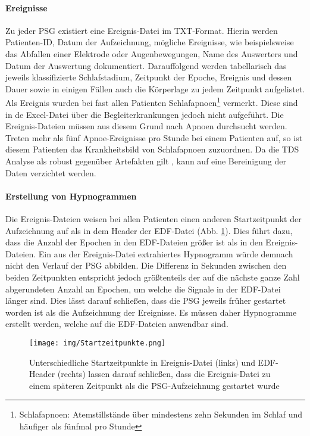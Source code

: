\paragraph{Ereignisse} Zu jeder \acs{PSG} existiert eine Ereignis-Datei im TXT-Format. Hierin werden Patienten-ID, Datum der Aufzeichnung, mögliche Ereignisse, wie beispielsweise das Abfallen einer Elektrode oder Augenbewegungen, Name des Auswerters und Datum der Auswertung dokumentiert. Darauffolgend werden tabellarisch das jeweils klassifizierte Schlafstadium, Zeitpunkt der Epoche, Ereignis und dessen Dauer sowie in einigen Fällen auch die Körperlage zu jedem Zeitpunkt aufgelistet. Als Ereignis wurden bei fast allen Patienten Schlafapnoen\footnote{Schlafapnoen: Atemstillstände über mindestens zehn Sekunden im Schlaf und häufiger als fünfmal pro Stunde} vermerkt. Diese sind in de Excel-Datei über die Begleiterkrankungen jedoch nicht aufgeführt. Die Ereignis-Dateien müssen aus diesem Grund nach Apnoen durchsucht werden. Treten mehr als fünf Apnoe-Ereignisse pro Stunde bei einem Patienten auf, so ist diesem Patienten das Krankheitsbild von Schlafapnoen zuzuordnen. 
Da die \acs{TDS} Analyse als robust gegenüber Artefakten gilt \parencite{breuer_netzwerktopologie_2016}, kann auf eine Bereinigung der Daten verzichtet werden.

\paragraph{Erstellung von Hypnogrammen} Die Ereignis-Dateien weisen bei allen Patienten einen anderen Startzeitpunkt der Aufzeichnung auf als in dem Header der \acs{EDF}-Datei (Abb. \ref{fig:zeitpunkte}). Dies führt dazu, dass die Anzahl der Epochen in den \acs{EDF}-Dateien größer ist als in den Ereignis-Dateien. Ein aus der Ereignis-Datei extrahiertes Hypnogramm würde demnach nicht den Verlauf der \acs{PSG} abbilden. Die Differenz in Sekunden zwischen den beiden Zeitpunkten entspricht jedoch größtenteils der auf die nächste ganze Zahl abgerundeten Anzahl an Epochen, um welche die Signale in der \acs{EDF}-Datei länger sind. Dies lässt darauf schließen, dass die \acs{PSG} jeweils früher gestartet worden ist als die Aufzeichnung der Ereignisse. Es müssen daher Hypnogramme erstellt werden, welche auf die \acs{EDF}-Dateien anwendbar sind.

\begin{figure}[H]
	\centering
	\texttt{[image: img/Startzeitpunkte.png]}
	\caption[Startzeitpunkte von Ereignis- und \acs{EDF}-Datei]{Unterschiedliche Startzeitpunkte in Ereignis-Datei (links) und \acs{EDF}-Header (rechts) lassen darauf schließen, dass die Ereignis-Datei zu einem späteren Zeitpunkt als die \acs{PSG}-Aufzeichnung gestartet wurde}
	\label{fig:zeitpunkte}
\end{figure}

